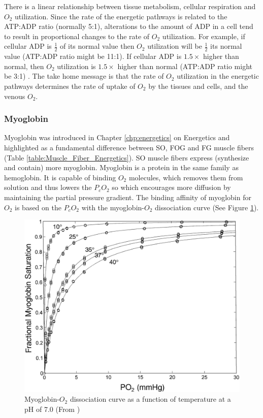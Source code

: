 There is a linear relationship between tissue metabolism, cellular respiration and $O_2$ utilization. Since the rate of the energetic pathways is related to the ATP:ADP ratio (normally 5:1), alterations to the amount of ADP in a cell tend to result in proportional changes to the rate of $O_2$ utilization. For example, if cellular ADP is $\frac{1}{2}$ of its normal value then $O_2$ utilization will be $\frac{1}{2}$ its normal value (ATP:ADP ratio might be 11:1). If cellular ADP is $1.5 \times$ higher than normal, then $O_2$ utilization is $1.5 \times$ higher than normal (ATP:ADP ratio might be 3:1) \cite{hall_guyton_2020}. The take home message is that the rate of $O_2$ utilization in the energetic pathways determines the rate of uptake of $O_2$ by the tissues and cells, and the venous $O_2$. 

\subsubsection{Myoglobin}

Myoglobin was introduced in Chapter \ref{chp:energetics} on Energetics and highlighted as a fundamental difference between SO, FOG and FG muscle fibers (Table \ref{table:Muscle_Fiber_Energetics}). SO muscle fibers express (synthesize and contain) more myoglobin. Myoglobin is a protein in the same family as hemoglobin. It is capable of binding $O_2$ molecules, which removes them from solution and thus lowers the $P_cO_2$ so which encourages more diffusion by maintaining the partial pressure gradient. The binding affinity of myoglobin for $O_2$ is based on the $P_cO_2$ with the myoglobin-$O_2$ dissociation curve (See Figure \ref{fig:myoglobin_dissociation}).


\begin{figure}[!h]
    \centering
    \includegraphics[width = 1.0\linewidth]{./figure/myoglobin_dissociation.jpeg}
    \caption{Myoglobin-$O_2$ dissociation curve as a function of temperature at a pH of 7.0 \footnotesize{(From \cite{schenkman_myoglobin_1997})}}
    \label{fig:myoglobin_dissociation}
\end{figure}

